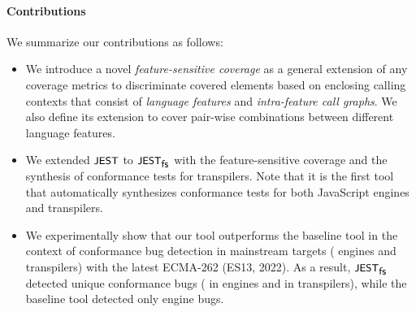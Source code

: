 
\paragraph{\textbf{Contributions}}
%
We summarize our contributions as follows:
%
\begin{itemize}

  \item
    We introduce a novel \textit{feature-sensitive coverage} as a general
    extension of any coverage metrics to discriminate covered elements based on
    enclosing calling contexts that consist of \textit{language features} and
    \textit{intra-feature call graphs}.
    We also define its extension to cover pair-wise combinations between
    different language features.

  \item
    We extended $\textsf{\small JEST}$ to $\textsf{\small JEST}_{\textsf{\small fs}}$ with the feature-sensitive coverage and
    the synthesis of conformance tests for transpilers.
    Note that it is the first tool that automatically synthesizes conformance
    tests for both JavaScript engines and transpilers.

  \item
    We experimentally show that our tool outperforms the baseline tool in the
    context of conformance bug detection in  mainstream targets
    ( engines and  transpilers) with the latest ECMA-262
    (ES13, 2022).
    As a result, $\textsf{\small JEST}_{\textsf{\small fs}}$ detected  unique conformance bugs (
    in engines and  in transpilers), while the baseline tool detected
    only  engine bugs.
\end{itemize}
